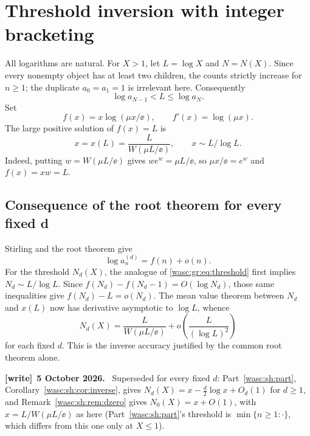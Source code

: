 \documentclass[11pt,a4paper]{article}
\theoremstyle{remark}\newtheorem{remark}[theorem]{Remark}
\numberwithin{equation}{section}
\newenvironment{writenote}[1][]{\par\smallskip\begingroup\small
 \noindent\textbf{[write]}\if\relax\detokenize{#1}\relax\else~\textbf{#1.}\fi\ }%
 {\par\endgroup\smallskip}
\begin{document}
\section{Threshold inversion with integer bracketing}\label{wasc:gr:sec:inverse}
All logarithms are natural. For $X>1$, let $L=\log X$ and $N=N(X)$. Since every nonempty object has at least two children, the counts strictly increase for $n\ge1$; the duplicate $a_0=a_1=1$ is irrelevant here. Consequently
\begin{equation}\label{wasc:gr:eq:threshold}
\log a_{N-1}<L\le\log a_N.
\end{equation}
Set
\begin{equation}\label{wasc:gr:eq:f}
f(x)=x\log(\mu x/\ee),\qquad f'(x)=\log(\mu x).
\end{equation}
The large positive solution of $f(x)=L$ is
\begin{equation}\label{wasc:gr:eq:W}
x=x(L)=\frac{L}{W(\mu L/\ee)},\qquad x\sim L/\log L.
\end{equation}
Indeed, putting $w=W(\mu L/\ee)$ gives $we^w=\mu L/\ee$, so $\mu x/\ee=e^w$ and $f(x)=xw=L$.

\subsection{Consequence of the root theorem for every fixed d}
Stirling and the root theorem give
\[
\log a_n^{(d)}=f(n)+o(n).
\]
For the threshold $N_d(X)$, the analogue of \eqref{wasc:gr:eq:threshold} first implies $N_d\sim L/\log L$. Since $f(N_d)-f(N_d-1)=O(\log N_d)$, those same inequalities give $f(N_d)-L=o(N_d)$. The mean value theorem between $N_d$ and $x(L)$ now has derivative asymptotic to $\log L$, whence
\begin{equation}\label{wasc:gr:eq:dinverse}
N_d(X)=\frac{L}{W(\mu L/\ee)}+o\!\left(\frac{L}{(\log L)^2}\right)
\end{equation}
for each fixed $d$. This is the inverse accuracy justified by the common root theorem alone.
\begin{writenote}[5 October 2026]
Superseded for every fixed $d$: Part~\ref{wasc:sh:part}, Corollary~\ref{wasc:sh:cor:inverse}, gives $N_d(X)=x-\frac d2\log x+O_d(1)$ for $d\ge1$, and Remark~\ref{wasc:sh:rem:dzero} gives $N_0(X)=x+O(1)$, with $x=L/W(\mu L/\ee)$ as here (Part~\ref{wasc:sh:part}'s threshold is $\min\{n\ge1:\cdot\}$, which differs from this one only at $X\le1$).
\end{writenote}
\end{document}
